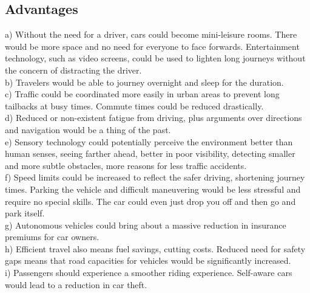 \documentclass[conference]{IEEEtran}
\begin{document}
\subsection{Advantages}
a) Without the need for a driver, cars could become mini-leisure rooms. There would be more space and no need for everyone to face forwards. Entertainment technology, such as video screens, could be used to lighten long journeys without the concern of distracting the driver.\\
b) Travelers would be able to journey overnight and sleep for the duration.\\
c) Traffic could be coordinated more easily in urban areas to prevent long tailbacks at busy times. Commute times could be reduced drastically.\\
d) Reduced or non-existent fatigue from driving, plus arguments over directions and navigation would be a thing of the past.\\
e) Sensory technology could potentially perceive the environment better than human senses, seeing farther ahead, better in poor visibility, detecting smaller and more subtle obstacles, more reasons for less traffic accidents.\\
f) Speed limits could be increased to reflect the safer driving, shortening journey times.
Parking the vehicle and difficult maneuvering would be less stressful and require no special skills. The car could even just drop you off and then go and park itself.\\
g) Autonomous vehicles could bring about a massive reduction in insurance premiums for car owners.\\

h) Efficient travel also means fuel savings, cutting costs.
Reduced need for safety gaps means that road capacities for vehicles would be significantly increased.\\

i) Passengers should experience a smoother riding experience.
Self-aware cars would lead to a reduction in car theft.
\end{document}
